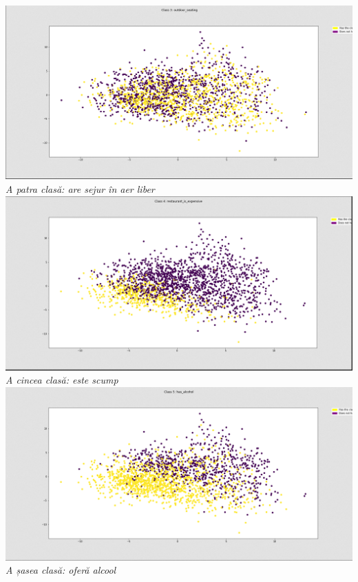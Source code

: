\begin{center}
\includegraphics[scale=0.4]{class3} \\
\textit{A patra clasă: are sejur în aer liber} \\

\includegraphics[scale=0.4]{class4} \\
\textit{A cincea clasă: este scump} \\

\includegraphics[scale=0.4]{class5} \\
\textit{A șasea clasă: oferă alcool} \\


\end{center}
